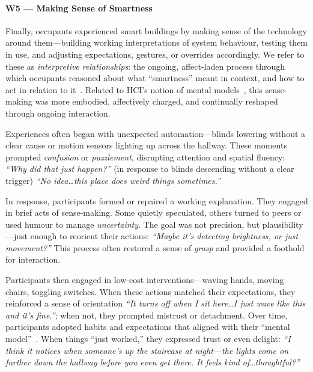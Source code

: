 \paragraph{W5 --- Making Sense of Smartness}
\label{theme:w5}
Finally, occupants experienced smart buildings by making sense of the technology around them---building working interpretations of system behaviour, testing them in use, and adjusting expectations, gestures, or overrides accordingly. We refer to these as \textit{interpretive relationships}: the ongoing, affect-laden process through which occupants reasoned about what ``smartness'' meant in context, and how to act in relation to it~\cite{dourish2001action, bellotti2002making}. Related to HCI’s notion of mental models~\cite{hu2023scoping}, this sense-making was more embodied, affectively charged, and continually reshaped through ongoing interaction.

Experiences often began with unexpected automation---blinds lowering without a clear cause or motion sensors lighting up across the hallway. These moments prompted \textit{confusion} or \textit{puzzlement}, disrupting attention and spatial fluency: \textit{``Why did that just happen?''} (in response to blinds descending without a clear trigger) \textit{``No idea\ldots this place does weird things sometimes.''}

In response, participants formed or repaired a working explanation. They engaged in brief acts of sense-making. Some quietly speculated, others turned to peers or used humour to manage \textit{uncertainty}. The goal was not precision, but plausibility---just enough to reorient their actions: \textit{``Maybe it’s detecting brightness, or just movement?''} This process often restored a sense of \textit{grasp} and provided a foothold for interaction.

Participants then engaged in low-cost interventions---waving hands, moving chairs, toggling switches. When these actions matched their expectations, they reinforced a sense of orientation \textit{``It turns off when I sit here\ldots I just wave like this and it’s fine.''}; when not, they prompted mistrust or detachment. Over time, participants adopted habits and expectations that aligned with their ``mental model''~\cite{hu2023scoping}. When things ``just worked,'' they expressed trust or even delight: \textit{``I think it notices when someone’s up the staircase at night---the lights come on further down the hallway before you even get there. It feels kind of\ldots thoughtful?''}